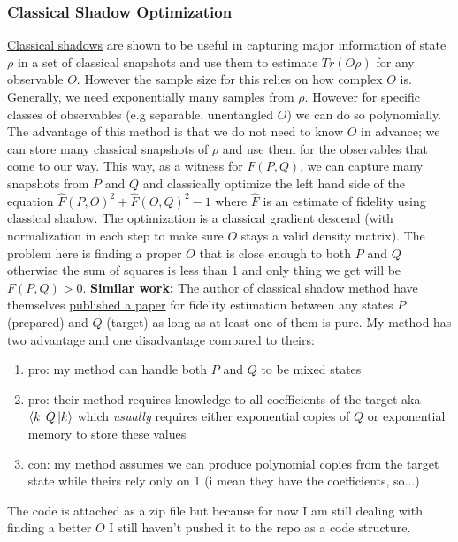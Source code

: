 \documentclass[11pt]{article}
\begin{document}
\subsubsection{Classical Shadow Optimization}
\label{sec:classical-shadow}
\href{https://doi.org/10.48550/arXiv.2002.08953}{Classical shadows} are shown to be useful in capturing major information of state $\rho$ in a set of classical snapshots and use them to estimate $Tr(O\rho)$ for any observable $O$. However the sample size for this relies on how complex $O$ is. Generally, we need exponentially many samples from $\rho$. However for specific classes of observables (e.g separable, unentangled $O$) we can do so polynomially. The advantage of this method is that we do not need to know $O$ in advance; we can store many classical snapshots of $\rho$ and use them for the observables that come to our way. This way, as a witness for $F(P, Q)$, we can capture many snapshots from $P$ and $Q$ and classically optimize the left hand side of the equation $\hat{F}(P, O)^2 + \hat{F}(O, Q)^2 - 1$ where $\hat{F}$ is an estimate of fidelity using classical shadow. The optimization is a classical gradient descend (with normalization in each step to make sure $O$ stays a valid density matrix). The problem here is finding a proper $O$ that is close enough to both $P$ and $Q$ otherwise the sum of squares is less than 1 and only thing we get will be $F(P, Q) > 0$. 
\textbf{Similar work:} The author of classical shadow method have themselves \href{https://doi.org/10.48550/arXiv.2404.07281}{published a paper} for fidelity estimation between any states $P$ (prepared) and $Q$ (target) as long as at least one of them is pure. My method has two advantage and one disadvantage compared to theirs:
\begin{enumerate}
    \item pro: my method can handle both $P$ and $Q$ to be mixed states
    \item pro: their method requires knowledge to all coefficients of the target aka $\bra{k}Q\ket{k}$ which \textit{usually} requires either exponential copies of $Q$ or exponential memory to store these values
    \item con: my method assumes we can produce polynomial copies from the target state while theirs rely only on 1 (i mean they have the coefficients, so...)
\end{enumerate}
The code is attached as a zip file but because for now I am still dealing with finding a better $O$ I still haven't pushed it to the repo as a code structure.
\end{document}
